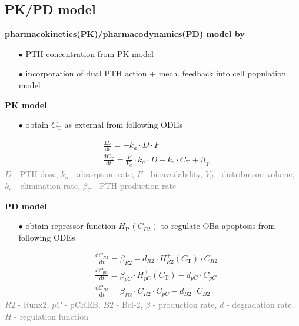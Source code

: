 \documentclass[%
aspectratio=169,  %
]{beamer}
\begin{document}
\subsection{PK/PD model}
\begin{frame}
\textbf{pharmacokinetics(PK)/pharmacodynamics(PD) model by \cite{Lavaill.2020}}
\begin{itemize}
\item[$\bullet$] PTH concentration from PK model
\item[$\bullet$] incorporation of dual PTH action + mech. feedback into cell population model
\end{itemize}
\textbf{PK model}
\begin{itemize}
\item[$\bullet$] obtain $C_\text{T}$ as external  from following ODEs
\end{itemize}
\begin{subequations}
\begin{align}
&\frac{\text{d} D}{\text{d} t} = -k_a \cdot D \cdot F \\
&\frac{\text{d} C_\text{T}}{\text{d} t} = \frac{F}{V_d} \cdot k_a \cdot D - k_e \cdot C_\text{T} + \beta_\text{T}
\end{align}
\label{eq:model4-PK}
\end{subequations}
\textcolor{gray}{$D$ - PTH dose, $k_a$ - absorption rate, $F$ - bioavailability, $V_d$ - distribution volume, $k_e$ - elimination rate, $\beta_T$ - PTH production rate}
\end{frame}

\begin{frame}
\textbf{PD model}
\begin{itemize}
\item[$\bullet$] obtain repressor function $H^{-}_\text{P}(C_{B2})$ to regulate OBa apoptosis from following ODEs
\end{itemize}
\begin{subequations}
\begin{align}
&\frac{\text{d} C_{R2}}{\text{d}t} = \beta_{R2} -d_{R2} \cdot H^{+}_{R2} (C_\text{T})\cdot C_{R2} \\
&\frac{\text{d}C_{pC}}{\text{d}t} = \beta_{pC} \cdot H^{+}_{pC} (C_\text{T})  - d_{pC} \cdot C_{pC} \\ 
&  \frac{\text{d} C_{B2}}{\text{d}t} = \beta_{B2} \cdot C_{R2} \cdot C_{pC} - d_{B2} \cdot C_{B2}
\end{align}
\label{eq:model4-PD}
\end{subequations}
\textcolor{gray}{$R2$ - Runx2, $pC$ - pCREB, $B2$ - Bcl-2, $\beta$ - production rate, $d$ - degradation rate, $H$ - regulation function }
\end{frame}
\end{document}
